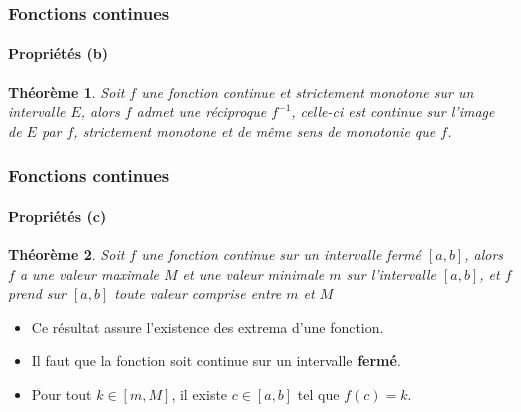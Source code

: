 \documentclass[10pt,notheorems]{beamer}
\theoremstyle{plain}
\newtheorem{theorem}{Théorème}
\theoremstyle{definition} %
\begin{document}
\begin{frame}
  \frametitle{Fonctions continues}
  \framesubtitle{Propriétés (b)}

  \begin{theorem}
    Soit $f$ une fonction continue et strictement monotone sur un intervalle $E$, alors $f$ admet une réciproque $f^{-1}$, celle-ci est continue sur l'image de $E$ par $f$, strictement monotone et de même sens de monotonie que $f$.
  \end{theorem}

\end{frame}


\begin{frame}
  \frametitle{Fonctions continues}
  \framesubtitle{Propriétés (c)}

  \begin{theorem}
    Soit $f$ une fonction continue sur un intervalle fermé $[a,b]$, alors $f$ a une valeur maximale $M$ et une valeur minimale $m$ sur l'intervalle $[a,b]$, et $f$ prend sur $[a,b]$ toute valeur comprise entre $m$ et $M$
  \end{theorem}

  \bigskip

  \begin{itemize}

  \item Ce résultat assure l'existence des extrema d'une fonction.\newline

  \item Il faut que la fonction soit continue sur un intervalle \textbf{fermé}.\newline

  \item Pour tout $k\in[m,M]$, il existe $c\in[a,b]$ tel que $f(c)=k$.

  \end{itemize}

\end{frame}
\end{document}
